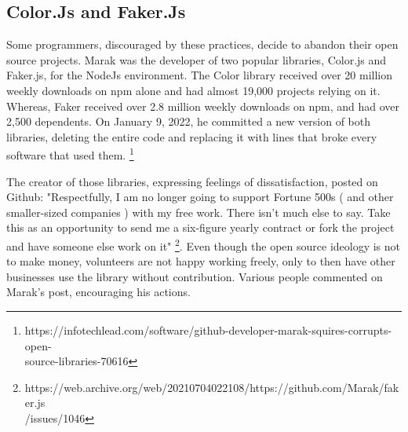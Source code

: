 \documentclass[12pt, a4paper]{article}
\begin{document}
  \subsection{Color.Js and Faker.Js}
  Some programmers, discouraged by these practices, decide to abandon their open source projects. Marak was the developer of two popular libraries, Color.js and Faker.js, for the NodeJs environment. The Color library received over 20 million weekly downloads on npm alone and had almost 19,000 projects relying on it. Whereas, Faker received over 2.8 million weekly downloads on npm, and had over 2,500 dependents. On January 9, 2022, he committed a new version of both libraries, deleting the entire code and replacing it with lines that broke every software that used them. \footnote{https://infotechlead.com/software/github-developer-marak-squires-corrupts-open-\\source-libraries-70616}

  The creator of those libraries, expressing feelings of dissatisfaction, posted on Github: "Respectfully, I am no longer going to support Fortune 500s ( and other smaller-sized companies ) with my free work. There isn't much else to say. Take this as an opportunity to send me a six-figure yearly contract or fork the project and have someone else work on it" \footnote{https://web.archive.org/web/20210704022108/https://github.com/Marak/faker.js\\/issues/1046}. Even though the open source ideology is not to make money, volunteers are not happy working freely, only to then have other businesses use the library without contribution. Various people commented on Marak's post, encouraging his actions. 
\end{document}
